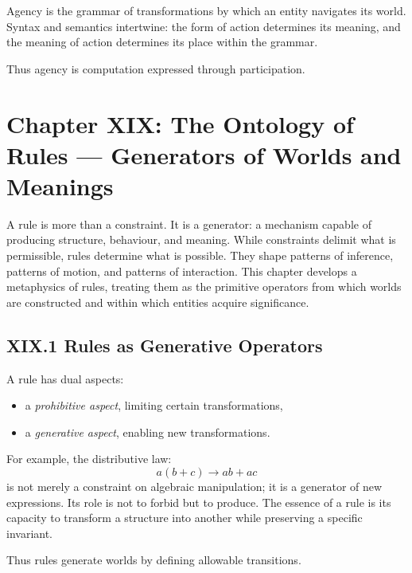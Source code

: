 \documentclass[12pt,letterpaper]{article}
\begin{document}
Agency is the grammar of transformations by which an entity navigates its world. Syntax and semantics intertwine: the form of action determines its meaning, and the meaning of action determines its place within the grammar.

Thus agency is computation expressed through participation.

\newpage
\section{Chapter XIX: The Ontology of Rules — Generators of Worlds and Meanings}

A rule is more than a constraint. It is a generator: a mechanism capable of producing structure, behaviour, and meaning. While constraints delimit what is permissible, rules determine what is possible. They shape patterns of inference, patterns of motion, and patterns of interaction. This chapter develops a metaphysics of rules, treating them as the primitive operators from which worlds are constructed and within which entities acquire significance.

\subsection{XIX.1 Rules as Generative Operators}

A rule has dual aspects:

\begin{itemize}
    \item a \emph{prohibitive aspect}, limiting certain transformations,
    \item a \emph{generative aspect}, enabling new transformations.
\end{itemize}

For example, the distributive law:
\[
a(b + c) \to ab + ac
\]
is not merely a constraint on algebraic manipulation; it is a generator of new expressions. Its role is not to forbid but to produce. The essence of a rule is its capacity to transform a structure into another while preserving a specific invariant.

Thus rules generate worlds by defining allowable transitions.

\end{document}
